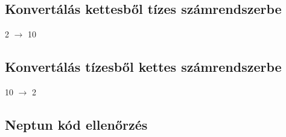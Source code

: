 \documentclass[usenames,dvipsnames,aspectratio=169]{beamer}
\begin{document}
\subsection{Konvertálás kettesből tízes számrendszerbe}
\begin{frame}
  \begin{exampleblock}{ 2 $\to$ 10}
    \footnotesize
    \vspace{-.2cm}
    
    \vspace{-.2cm}
  \end{exampleblock}
\end{frame}

\subsection{Konvertálás tízesből kettes számrendszerbe}
\begin{frame}
  \begin{exampleblock}{ 10 $\to$ 2}
    \small
    
  \end{exampleblock}
\end{frame}

\subsection{Neptun kód ellenőrzés}
\begin{frame}
  \begin{exampleblock}{}
  \tiny
  \vspace{-.2cm}
  
  \vspace{-.2cm}
\end{exampleblock}
\end{frame}

\begin{frame}
  \scriptsize
  \begin{exampleblock}{}
  \vspace{-.2cm}
  
  \vspace{-.2cm}
\end{exampleblock}
\end{frame}
\end{document}

